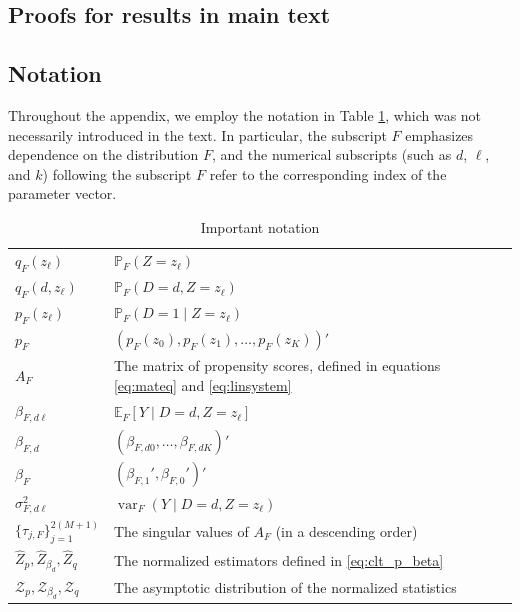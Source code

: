 \documentclass[11pt]{article}
\theoremstyle{definition}
\DeclareMathOperator{\var}{var}
\newcommand{\Exp}{\ensuremath{\mathbb{E}}} %
\newcommand{\Prob}{\ensuremath{\mathbb{P}}} %
\newcommand{\0}{\ensuremath{\mathbf{0}}}
\begin{document}
\begin{bibunit}
\section{Proofs for results in main text}
\label{sec:main_proofs}

\subsection{Notation}
Throughout the appendix, we employ the notation in Table \ref{tab:notation}, which was not necessarily introduced in the text.  In particular, the subscript $F$ emphasizes dependence on the distribution $F$, and the numerical subscripts (such as $d$, $\ell$, and $k$) following the subscript $F$ refer to the corresponding index of the parameter vector.

\begin{table}[htbp]
\centering
\caption{Important notation}
\label{tab:notation}
\begin{tabular}{p{3cm}p{}}
\toprule
$q_F(z_\ell)$ 						& $\Prob_F(Z=z_\ell)$ \\
$q_F(d, z_\ell)$ 					& $\Prob_F(D=d, Z=z_\ell)$ \\
$p_F(z_\ell)$ 						& $\Prob_F(D=1\mid Z=z_\ell)$ \\
$p_F$								& $(p_F(z_0), p_F(z_1), \ldots, p_F(z_K))'$ \\
$A_F$								& The matrix of propensity scores, defined in equations \eqref{eq:mateq} and \eqref{eq:linsystem} \\
$\beta_{F,d\ell}$					& $\Exp_F[Y\mid D=d, Z=z_\ell]$ \\
$\beta_{F,d}$						& $(\beta_{F,d0}, \ldots, \beta_{F,dK})'$ \\
$\beta_F$							& $(\beta_{F,1}', \beta_{F,0}')'$ \\
$\sigma_{F,d\ell}^2$				& $\var_F(Y\mid D=d, Z=z_\ell)$ \\
%
%
$\{\tau_{j,F}\}_{j=1}^{2(M+1)}$		& The singular values of $A_F$ (in a descending order) \\
$\hat{Z}_p, \hat{Z}_{\beta_d}, \hat{Z}_{q}$ & The normalized estimators defined in \eqref{eq:clt_p_beta} \\
$\mathcal{Z}_p, \mathcal{Z}_{\beta_d}, \mathcal{Z}_q$ & The asymptotic distribution of the normalized statistics \\
%
%
\bottomrule
\end{tabular}
\end{table}


\end{bibunit}
\end{document}
